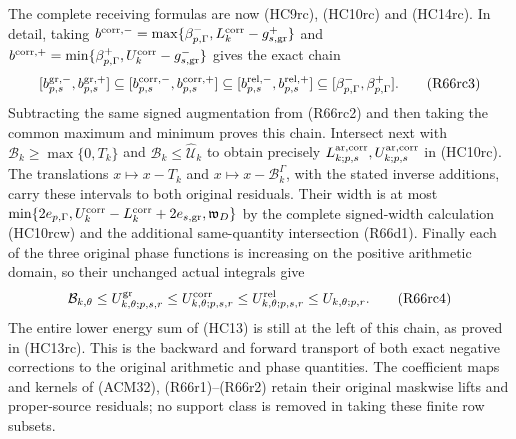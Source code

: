 The complete receiving formulas are now (HC9rc), (HC10rc) and
(HC14rc). In detail, taking
$b^{\rm corr,-}=\max\{\beta_{p,\Gamma}^-,L_k^{\rm corr}-g_{s,\rm gr}^+\}$
and
$b^{\rm corr,+}=\min\{\beta_{p,\Gamma}^+,U_k^{\rm corr}-g_{s,\rm gr}^-\}$
gives the exact chain
\[
 [b_{p,s}^{\rm gr,-},b_{p,s}^{\rm gr,+}]
 \subseteq[b_{p,s}^{\rm corr,-},b_{p,s}^{\rm corr,+}]
 \subseteq[b_{p,s}^{\rm rel,-},b_{p,s}^{\rm rel,+}]
 \subseteq[\beta_{p,\Gamma}^-,\beta_{p,\Gamma}^+].
 \tag{R66rc3}
\]
Subtracting the same signed augmentation from (R66rc2) and
then taking the common maximum and minimum proves this chain.
Intersect next with $\mathcal B_k\geq\max\{0,T_k\}$ and
$\mathcal B_k\leq\widehat{\mathcal U}_k$ to obtain precisely
$L_{k;p,s}^{\rm ar,corr},U_{k;p,s}^{\rm ar,corr}$ in (HC10rc).
The translations $x\mapsto x-T_k$ and
$x\mapsto x-\mathcal B_k^\Gamma$, with the stated inverse
additions, carry these intervals to both original residuals.
Their width is at most
$\min\{2e_{p,\Gamma},U_k^{\rm corr}-L_k^{\rm corr}
+2e_{s,\rm gr},\mathfrak w_D\}$
by the complete signed-width calculation (HC10rcw) and
the additional same-quantity intersection (R66d1).
Finally each of the three original phase functions is increasing
on the positive arithmetic domain, so their unchanged actual
integrals give
\[
 \mathcal B_{k,\theta}
 \leq U_{k,\theta;p,s,r}^{\rm gr}
 \leq U_{k,\theta;p,s,r}^{\rm corr}
 \leq U_{k,\theta;p,s,r}^{\rm rel}\leq U_{k,\theta;p,r}.
 \tag{R66rc4}
\]
The entire lower energy sum of (HC13) is still at the left of
this chain, as proved in (HC13rc). This is the backward and
forward transport of both exact negative corrections to the
original arithmetic and phase quantities. The coefficient maps
and kernels of (ACM32), (R66r1)--(R66r2) retain their original
maskwise lifts and proper-source residuals; no support class is
removed in taking these finite row subsets.


